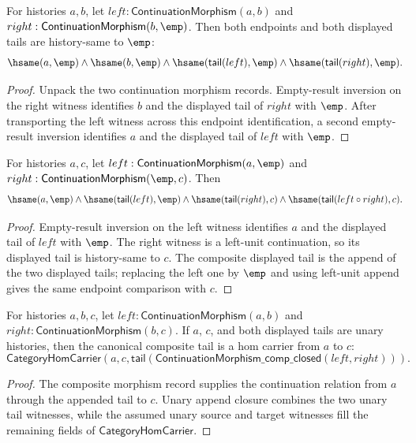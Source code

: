 \begin{theorem}
\label{thm:continuation-morphism-comp-empty-target-inversion}
For histories $a,b$, let $left:\mathsf{ContinuationMorphism}(a,b)$ and
$right:\mathsf{ContinuationMorphism}(b,\emp)$. Then both endpoints and both
displayed tails are history-same to $\emp$:
$$
\hsame(a,\emp)\land\hsame(b,\emp)\land
\hsame(\mathsf{tail}(left),\emp)\land
\hsame(\mathsf{tail}(right),\emp).
$$
\end{theorem}
\begin{proof}
Unpack the two continuation morphism records. Empty-result inversion on the
right witness identifies $b$ and the displayed tail of $right$ with $\emp$.
After transporting the left witness across this endpoint identification, a
second empty-result inversion identifies $a$ and the displayed tail of $left$
with $\emp$.
\end{proof}

\begin{theorem}
\label{thm:continuation-morphism-comp-empty-middle-inversion}
For histories $a,c$, let $left:\mathsf{ContinuationMorphism}(a,\emp)$ and
$right:\mathsf{ContinuationMorphism}(\emp,c)$. Then
$$
\hsame(a,\emp)\land
\hsame(\mathsf{tail}(left),\emp)\land
\hsame(\mathsf{tail}(right),c)\land
\hsame(\mathsf{tail}(left\circ right),c).
$$
\end{theorem}
\begin{proof}
Empty-result inversion on the left witness identifies $a$ and the displayed
tail of $left$ with $\emp$. The right witness is a left-unit continuation, so
its displayed tail is history-same to $c$. The composite displayed tail is the
append of the two displayed tails; replacing the left one by $\emp$ and using
left-unit append gives the same endpoint comparison with $c$.
\end{proof}

\begin{theorem}
\label{thm:continuation-morphism-comp-tail-category-hom-carrier}
For histories $a,b,c$, let $left:\mathsf{ContinuationMorphism}(a,b)$ and
$right:\mathsf{ContinuationMorphism}(b,c)$. If $a$, $c$, and both displayed
tails are unary histories, then the canonical composite tail is a hom carrier
from $a$ to $c$:
$$
\mathsf{CategoryHomCarrier}
  (a,c,\mathsf{tail}(\mathsf{ContinuationMorphism\_comp\_closed}(left,right))).
$$
\end{theorem}
\begin{proof}
The composite morphism record supplies the continuation relation from $a$
through the appended tail to $c$. Unary append closure combines the two unary
tail witnesses, while the assumed unary source and target witnesses fill the
remaining fields of $\mathsf{CategoryHomCarrier}$.
\end{proof}

